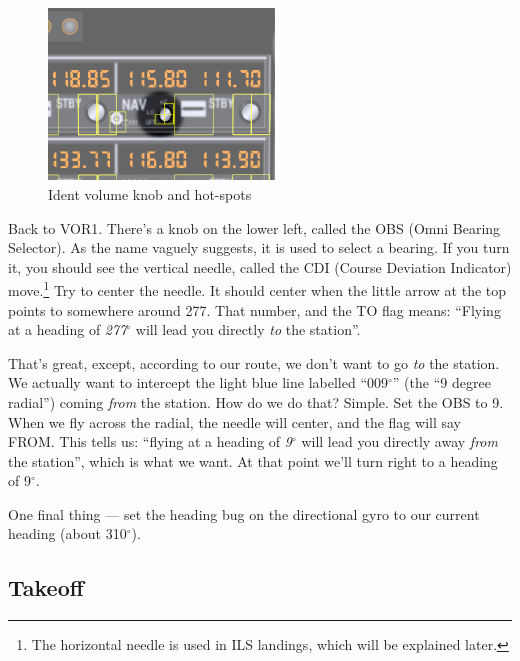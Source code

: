 
\begin{figure}
  \begin{center}
    \includegraphics[width=6cm]{img/ident_knob}
    \caption{Ident volume knob and hot-spots}
    \label{fig:ident}
  \end{center}
\end{figure}

Back to VOR1.  There's a knob on the lower left, called the OBS (Omni
Bearing Selector).  As the name vaguely suggests, it is used to select
a bearing.  If you turn it, you should see the vertical needle, called
the CDI (Course Deviation Indicator) move.\footnote{The horizontal
  needle is used in ILS landings, which will be explained later.}  Try
to center the needle.  It should center when the little arrow at the
top points to somewhere around 277.  That number, and the TO flag
means: ``Flying at a heading of \emph{277$^\circ$} will lead you
directly \emph{to} the station''.

That's great, except, according to our route, we don't want to go
\emph{to} the station.  We actually want to intercept the light blue
line labelled ``009$^\circ$'' (the ``9 degree radial'') coming
\emph{from} the station.  How do we do that?  Simple.  Set the OBS to
9.  When we fly across
the radial, the needle will center, and the flag will say FROM.  This
tells us: ``flying at a heading of \emph{9$^\circ$} will lead you
directly away \emph{from} the station'', which is what we want.  At
that point we'll turn right to a heading of 9$^\circ$.

One final thing --- set the heading bug on the directional gyro to our
current heading (about 310$^\circ$).

\subsection{Takeoff}

